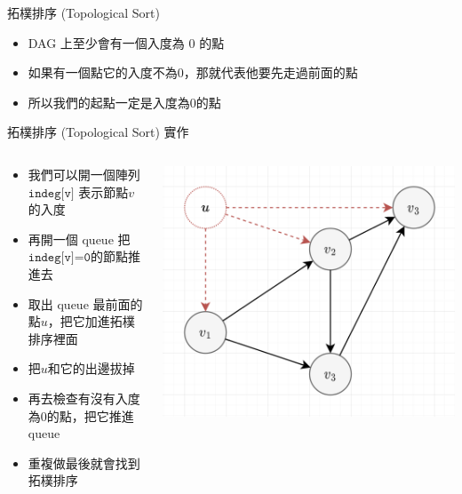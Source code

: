 \documentclass[aspectratio=169]{beamer}
\begin{document}
    \begin{frame}{拓樸排序 (Topological Sort)}
        \begin{itemize}
            \item DAG 上至少會有一個入度為 $0$ 的點
            \item<2-> 如果有一個點它的入度不為$0$，那就代表他要先走過前面的點
            \item<3-> 所以我們的起點一定是入度為$0$的點
        \end{itemize}
    \end{frame}
    
    \begin{frame}{拓樸排序 (Topological Sort) 實作}
        \begin{columns}
            \begin{column}{0.65\textwidth}
                \begin{itemize}
                    \item 我們可以開一個陣列 $\texttt{indeg[v]}$ 表示節點$v$的入度
                    \item<2-> 再開一個 queue 把$\texttt{indeg[v]=0}$的節點推進去
                    \item<3-> 取出 queue 最前面的點$u$，把它加進拓樸排序裡面
                    \item<3-> 把$u$和它的出邊拔掉
                    \item<4-> 再去檢查有沒有入度為$0$的點，把它推進 queue
                    \item<5-> 重複做最後就會找到拓樸排序
                \end{itemize}
            \end{column}
            \begin{column}{0.4\textwidth}
                \begin{center}
                    \includegraphics[scale=0.25]{images/topo_bfs.png}
                \end{center}
            \end{column}
        \end{columns}
    \end{frame}
    
\end{document}
